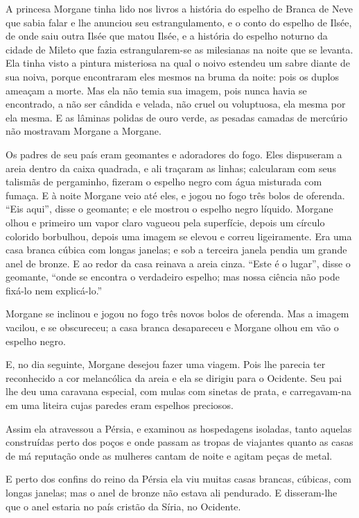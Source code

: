A princesa Morgane tinha lido nos livros a história do espelho de
Branca de Neve que sabia falar e lhe anunciou seu estrangulamento, e o
conto do espelho de Ilsée, de onde saiu outra Ilsée que matou Ilsée, e a
história do espelho noturno da cidade de Mileto que fazia estrangularem-se
as milesianas na noite que se levanta. Ela tinha visto a pintura
misteriosa na qual o noivo estendeu um sabre diante de sua noiva, porque
encontraram eles mesmos na bruma da noite: pois os duplos ameaçam a
morte. Mas ela não temia sua imagem, pois nunca havia se encontrado, a não
ser cândida e velada, não cruel ou voluptuosa, ela mesma por ela mesma. E
as lâminas polidas de ouro verde, as pesadas camadas de mercúrio não
mostravam Morgane a Morgane.

Os padres de seu país eram geomantes e adoradores do fogo. Eles
dispuseram a areia dentro da caixa quadrada, e ali traçaram as linhas;
calcularam com seus talismãs de pergaminho, fizeram o espelho negro com
água misturada com fumaça. E à noite Morgane veio até eles, e jogou no
fogo três bolos de oferenda. “Eis aqui”, disse o geomante; e ele mostrou o
espelho negro líquido. Morgane olhou e primeiro um vapor claro vagueou
pela superfície, depois um círculo colorido borbulhou, depois uma imagem
se elevou e correu ligeiramente. Era uma casa branca cúbica com longas
janelas; e sob a terceira janela pendia um grande anel de bronze. E ao
redor da casa reinava a areia cinza. “Este é o lugar'', disse o geomante,
``onde se encontra o verdadeiro espelho; mas nossa ciência não pode fixá-lo nem
explicá-lo.”

Morgane se inclinou e jogou no fogo três novos bolos de oferenda. Mas a
imagem vacilou, e se obscureceu; a casa branca desapareceu e Morgane olhou
em vão o espelho negro.

E, no dia seguinte, Morgane desejou fazer uma viagem. Pois lhe parecia
ter reconhecido a cor melancólica da areia e ela se dirigiu para o
Ocidente. Seu pai lhe deu uma caravana especial, com mulas com sinetas de
prata, e carregavam-na em uma liteira cujas paredes eram espelhos
preciosos.

Assim ela atravessou a Pérsia, e examinou as hospedagens isoladas,
tanto aquelas construídas perto dos poços e onde passam as tropas de
viajantes quanto as casas de má reputação onde as mulheres cantam de noite
e agitam peças de metal.

E perto dos confins do reino da Pérsia ela viu muitas casas brancas,
cúbicas, com longas janelas; mas o anel de bronze não estava ali
pendurado. E disseram-lhe que o anel estaria no país cristão da Síria, no
Ocidente.


